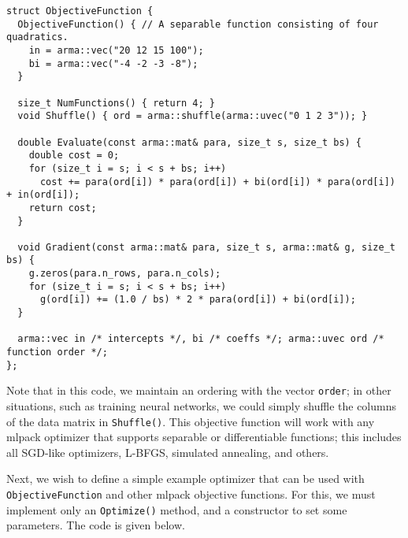 \documentclass{article}
\begin{document}
\vspace*{-0.3em}
\begin{verbatim}
struct ObjectiveFunction {
  ObjectiveFunction() { // A separable function consisting of four quadratics.
    in = arma::vec("20 12 15 100");
    bi = arma::vec("-4 -2 -3 -8");
  }

  size_t NumFunctions() { return 4; }
  void Shuffle() { ord = arma::shuffle(arma::uvec("0 1 2 3")); }

  double Evaluate(const arma::mat& para, size_t s, size_t bs) {
    double cost = 0;
    for (size_t i = s; i < s + bs; i++)
      cost += para(ord[i]) * para(ord[i]) + bi(ord[i]) * para(ord[i]) + in(ord[i]);
    return cost;
  }

  void Gradient(const arma::mat& para, size_t s, arma::mat& g, size_t bs) {
    g.zeros(para.n_rows, para.n_cols);
    for (size_t i = s; i < s + bs; i++)
      g(ord[i]) += (1.0 / bs) * 2 * para(ord[i]) + bi(ord[i]);
  }

  arma::vec in /* intercepts */, bi /* coeffs */; arma::uvec ord /* function order */;
};
\end{verbatim}
\vspace*{-0.3em}

Note that in this code, we maintain an ordering with the vector {\tt order}; in
other situations, such as training neural networks, we could simply shuffle the columns of the data
matrix in {\tt Shuffle()}.  This objective function will work with any mlpack
optimizer that supports separable or differentiable functions; this includes
all SGD-like optimizers, L-BFGS, simulated annealing, and others.

Next, we wish to define a simple example optimizer that can be used with {\tt
ObjectiveFunction} and other mlpack objective functions.  For this, we must
implement only an {\tt Optimize()} method, and a constructor to set some
parameters.  The code is given below.
\end{document}
